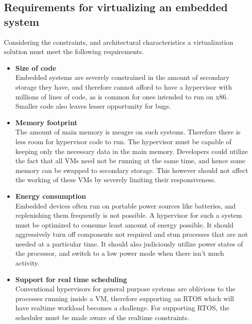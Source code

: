 \documentclass[seminar,twoside]{iitbreport}
\begin{document}
\subsection{Requirements for virtualizing an embedded system}
Considering the constraints, and architectural characteristics a virtualization solution must meet the following requirements.
\begin{itemize}
 \item \textbf{Size of code}\\
 Embedded systems are severely constrained in the amount of secondary storage they have, and therefore cannot afford to have a hypervisor with millions of lines of code,
 as is common for ones intended to run on x86. Smaller code also leaves lesser opportunity for bugs.
 
 \item \textbf{Memory footprint}\\
 The amount of main memory is meagre on such systems. Therefore there is less room for hypervisor code to run. The hypervisor must be capable of keeping only the necessary data
 in the main memory. Developers could utilize the fact that all VMs need not be running at the same time, and hence some memory can be swapped to secondary storage. This however
 should not affect the working of these VMs by severely limiting their responsiveness.
 \item \textbf{Energy consumption}\\
 Embedded devices often run on portable power sources like batteries, and replenishing them frequently is not possible. A hypervisor for such a system must be optimized to
 consume least amount of energy possible. It should aggressively turn off components not required and stun processes that are not needed at a particular time. It should 
 also judiciously utilize power states of the processor, and  switch to a low power mode when there isn't much activity.
 \item \textbf{Support for real time scheduling}\\
 Conventional hypervisors for general purpose systems are oblivious to the processes running inside a VM, therefore supporting an RTOS which will have realtime workload becomes 
 a challenge. For supporting RTOS, the scheduler must be made aware of the realtime constraints.

\end{itemize}

\newpage
\end{document}
